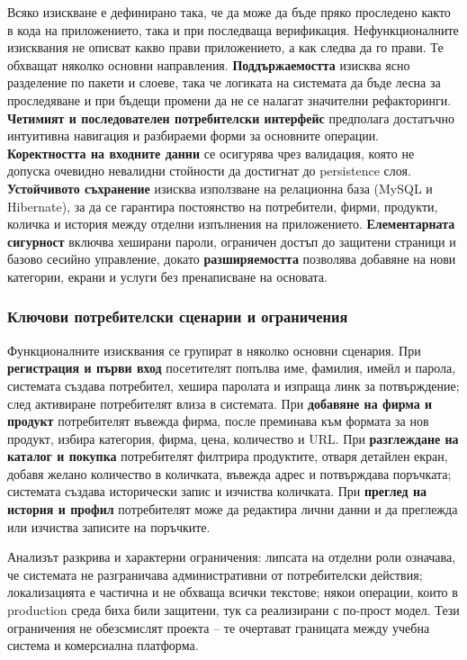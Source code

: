 Всяко изискване е дефинирано така, че да може да бъде пряко проследено както в кода на приложението, така и при последваща верификация. Нефункционалните изисквания не описват какво прави приложението, а как следва да го прави. Те обхващат няколко основни направления. \textbf{Поддържаемостта} изисква ясно разделение по пакети и слоеве, така че логиката на системата да бъде лесна за проследяване и при бъдещи промени да не се налагат значителни рефакторинги. \textbf{Четимият и последователен потребителски интерфейс} предполага достатъчно интуитивна навигация и разбираеми форми за основните операции. \textbf{Коректността на входните данни} се осигурява чрез валидация, която не допуска очевидно невалидни стойности да достигнат до persistence слоя. \textbf{Устойчивото съхранение} изисква използване на релационна база (MySQL и Hibernate), за да се гарантира постоянство на потребители, фирми, продукти, количка и история между отделни изпълнения на приложението. \textbf{Елементарната сигурност} включва хеширани пароли, ограничен достъп до защитени страници и базово сесийно управление, докато \textbf{разширяемостта} позволява добавяне на нови категории, екрани и услуги без пренаписване на основата.

\subsubsection{Ключови потребителски сценарии и ограничения}

Функционалните изисквания се групират в няколко основни сценария. При \textbf{регистрация и първи вход} посетителят попълва име, фамилия, имейл и парола, системата създава потребител, хешира паролата и изпраща линк за потвърждение; след активиране потребителят влиза в системата. При \textbf{добавяне на фирма и продукт} потребителят въвежда фирма, после преминава към формата за нов продукт, избира категория, фирма, цена, количество и URL. При \textbf{разглеждане на каталог и покупка} потребителят филтрира продуктите, отваря детайлен екран, добавя желано количество в количката, въвежда адрес и потвърждава поръчката; системата създава исторически запис и изчиства количката. При \textbf{преглед на история и профил} потребителят може да редактира лични данни и да преглежда или изчиства записите на поръчките.

Анализът разкрива и характерни ограничения: липсата на отделни роли означава, че системата не разграничава административни от потребителски действия; локализацията е частична и не обхваща всички текстове; някои операции, които в production среда биха били защитени, тук са реализирани с по-прост модел. Тези ограничения не обезсмислят проекта -- те очертават границата между учебна система и комерсиална платформа.

